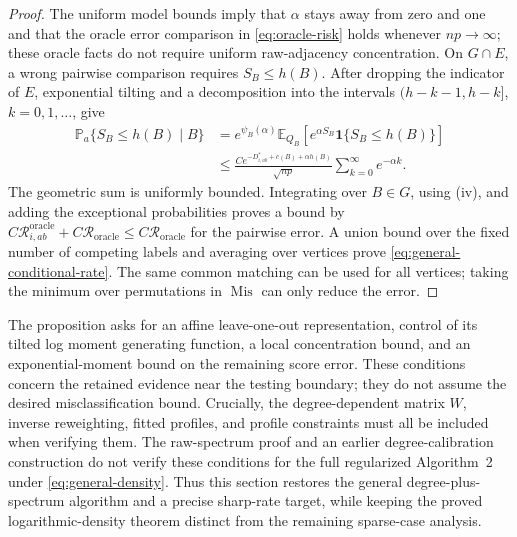 \documentclass[11pt]{article}
\theoremstyle{definition}
\theoremstyle{remark}
\newcommand{\Mis}{\operatorname{Mis}}
\newcommand{\E}{\mathbb E}
\newcommand{\PP}{\mathbb P}
\newcommand{\Roracle}{\mathcal R_{\mathrm{oracle}}}
\newcommand{\one}{\mathbf 1}
\numberwithin{equation}{section}
\begin{document}
\begin{proof}
The uniform model bounds imply that $\alpha$ stays away from zero and one
and that the oracle error comparison in \eqref{eq:oracle-risk} holds
whenever $np\to\infty$; these oracle facts do not require uniform
raw-adjacency concentration. On $G\cap E$, a wrong pairwise comparison
requires $S_B\le h(B)$. After dropping the indicator of $E$, exponential
tilting and a decomposition into the intervals
$(h-k-1,h-k]$, $k=0,1,\ldots$, give
\begin{align*}
 \PP_a\{S_B\le h(B)\mid B\}
 &=e^{\psi_B(\alpha)}
      \E_{Q_B}[e^{\alpha S_B}\one\{S_B\le h(B)\}]\\
 &\le \frac{C e^{-D^*_{i,ab}+c(B)+\alpha h(B)}}{\sqrt{np}}
           \sum_{k=0}^{\infty}e^{-\alpha k}.
\end{align*}
The geometric sum is uniformly bounded. Integrating over $B\in G$,
using (iv), and adding the exceptional probabilities proves a bound by
$C\mathcal R_{i,ab}^{\mathrm{oracle}}+C\Roracle\le C\Roracle$ for the pairwise error. A union bound
over the fixed number of competing labels and averaging over vertices
prove \eqref{eq:general-conditional-rate}. The same common matching can
be used for all vertices; taking the minimum over permutations in
$\Mis$ can only reduce the error.
\end{proof}

The proposition asks for an affine leave-one-out representation, control
of its tilted log moment generating function, a local concentration
bound, and an exponential-moment bound on the remaining score error.
These conditions concern the retained evidence near the testing boundary;
they do not assume the desired misclassification bound. Crucially, the
degree-dependent matrix $W$, inverse reweighting, fitted profiles, and
profile constraints must all be included when verifying them. The
raw-spectrum proof and an earlier degree-calibration construction do not
verify these conditions for the full regularized Algorithm~2 under
\eqref{eq:general-density}. Thus this section restores the general
degree-plus-spectrum algorithm and a precise sharp-rate target, while
keeping the proved logarithmic-density theorem distinct from the remaining
sparse-case analysis.
\end{document}
